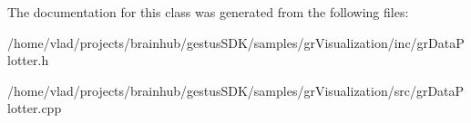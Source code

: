 The documentation for this class was generated from the following files\+:\begin{DoxyCompactItemize}
\item 
/home/vlad/projects/brainhub/gestus\+S\+D\+K/samples/gr\+Visualization/inc/gr\+Data\+Plotter.\+h\item 
/home/vlad/projects/brainhub/gestus\+S\+D\+K/samples/gr\+Visualization/src/gr\+Data\+Plotter.\+cpp\end{DoxyCompactItemize}
